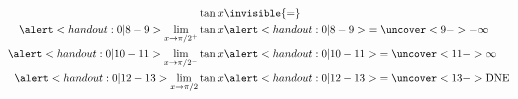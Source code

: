 \begin{frame}
\begin{columns}
\abovedisplayskip=0pt
\belowdisplayskip=-15pt
\abovedisplayshortskip=0pt
\belowdisplayshortskip=0pt
\begin{align*}
\tan x & \invisible{=} \\
\alert<handout:0| 8-9>{\lim_{x\to \pi/2^+}\tan x} & \alert<handout:0| 8-9>{= \uncover<9->{-\infty}} \\
\alert<handout:0| 10-11>{\lim_{x\to \pi/2^-}\tan x} & \alert<handout:0| 10-11>{= \uncover<11->{\infty}} \\
\alert<handout:0| 12-13>{\lim_{x\to \pi/2}\tan x} & \alert<handout:0| 12-13>{= \uncover<13->{\text{DNE}}} \\
\end{align*}
\end{columns}
\end{frame}
